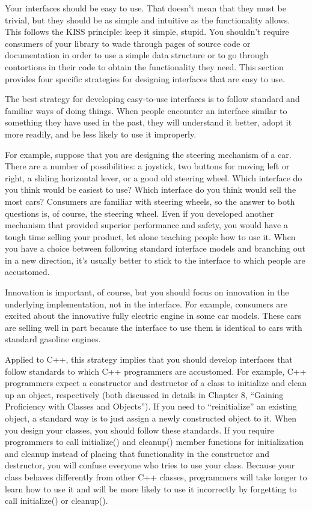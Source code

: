 
Your interfaces should be easy to use. That doesn’t mean that they must be trivial, but they should be as simple and intuitive as the functionality allows. This follows the KISS principle: keep it simple, stupid. You shouldn’t require consumers of your library to wade through pages of source code or documentation in order to use a simple data structure or to go through contortions in their code to obtain the functionality they need. This section provides four specific strategies for designing interfaces that are easy to use.


The best strategy for developing easy-to-use interfaces is to follow standard and familiar ways of doing things. When people encounter an interface similar to something they have used in the past, they will understand it better, adopt it more readily, and be less likely to use it improperly.

For example, suppose that you are designing the steering mechanism of a car. There are a number of possibilities: a joystick, two buttons for moving left or right, a sliding horizontal lever, or a good old steering wheel. Which interface do you think would be easiest to use? Which interface do you think would sell the most cars? Consumers are familiar with steering wheels, so the answer to both questions is, of course, the steering wheel. Even if you developed another mechanism that provided superior performance and safety, you would have a tough time selling your product, let alone teaching people how to use it. When you have a choice between following standard interface models and branching out in a new direction, it’s usually better to stick to the interface to which people are accustomed.

Innovation is important, of course, but you should focus on innovation in the underlying implementation, not in the interface. For example, consumers are excited about the innovative fully electric engine in some car models. These cars are selling well in part because the interface to use them is identical to cars with standard gasoline engines.

Applied to C++, this strategy implies that you should develop interfaces that follow standards to which C++ programmers are accustomed. For example, C++ programmers expect a constructor and destructor of a class to initialize and clean up an object, respectively (both discussed in details in Chapter 8, “Gaining Proficiency with Classes and Objects”). If you need to “reinitialize” an existing object, a standard way is to just assign a newly constructed object to it. When you design your classes, you should follow these standards. If you require programmers to call initialize() and cleanup() member functions for initialization and cleanup instead of placing that functionality in the constructor and destructor, you will confuse everyone who tries to use your class. Because your class behaves differently from other C++ classes, programmers will take longer to learn how to use it and will be more likely to use it incorrectly by forgetting to call initialize() or cleanup().


